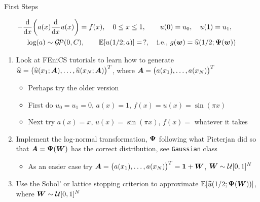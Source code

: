 \documentclass[11pt,compress,xcolor={usenames,dvipsnames},aspectratio=169]{beamer}
\DeclareMathOperator{\GP}{\mathcal{G} \! \mathcal{P}}
\newcommand{\hvu}{\widehat{\vu}}
\newcommand{\hu}{\widehat{u}}
\newcounter{enumcont}
\begin{document}
\begin{frame}{First Steps}

\vspace{-8ex}
\begin{gather*}
-\frac{\dif }{\dif x}\biggl(a(x) \frac{\dif}{\dif x} u(x) \biggr) = f(x), \quad 0 \leq x \leq 1, \qquad
u(0) = u_0, \quad
u(1) = u_1, \qquad \\
\log(a) \sim \GP(0,C), \qquad \Ex[u(1/2;a)] = \, ?, \quad \text{i.e., } g(\vw) = \hu(1/2;\vPsi(\vw))
\end{gather*}

\vspace{-3ex}
\begin{enumerate}
    \item Look at FEniCS tutorials to learn how to generate $\hvu = \bigl(\hu(x_1;\vA), \ldots, \hu(x_N;\vA)\bigr)^T$, where $\boldsymbol{A} = \bigl( a(x_1), \dots, a(x_N) \bigr)^T$
    \begin{itemize}
    \item Perhaps try the older version \href{https://pypi.org/project/fenics/}{}
        \item First do $u_0 = u_1 = 0$, $a(x) = 1$, $f(x) = u(x) = \sin(\pi x)$
        \item Next try $a(x) = x$, $u(x) = \sin (\pi x)$, $f(x) =$ whatever it takes
    \end{itemize}
    \item  Implement the log-normal transformation, $\boldsymbol{\Psi}$ following what Pieterjan did so that $\boldsymbol{A} = \boldsymbol{\Psi}(\boldsymbol{W})$ has the correct distribution, see \texttt{Gaussian} class
    \begin{itemize}
        \item As an easier case try  $\boldsymbol{A} = \bigl( a(x_1), \dots, a(x_N) \bigr)^T = \boldsymbol{1} + \boldsymbol{W}$, $\boldsymbol{W} \sim \mathcal{U}[0,1]^N$
    \end{itemize}
    \item Use the Sobol' or lattice stopping criterion to approximate  $\Ex[\hu(1/2;\vPsi(\vW))]$, where $\boldsymbol{W} \sim \mathcal{U}[0,1]^N$
    \setcounter{enumcont}{\value{enumi}}
\end{enumerate}

    
\end{frame}
\end{document}
